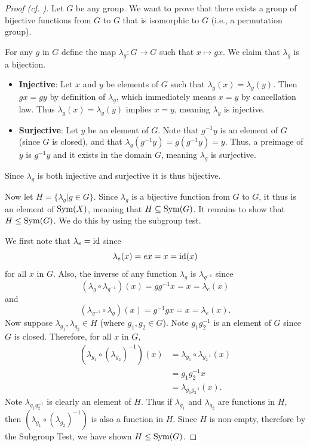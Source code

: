 \begin{proof}[Proof (cf. {\cite[Proof 2]{proofwiki_cayleytheorem}})]
    Let $G$ be any group. We want to prove that there exists a group of bijective functions from $G$ to $G$ that is isomorphic to $G$ (i.e., a permutation group).

    For any $g$ in $G$ define the map $\lambda_g: G \to G$ such that $x \mapsto gx$. We claim that $\lambda_g$ is a bijection.
    \begin{itemize}
        \item \textbf{Injective}: Let $x$ and $y$ be elements of $G$ such that $\lambda_g(x) = \lambda_g(y)$. Then $gx = gy$ by definition of $\lambda_g$, which immediately means $x = y$ by cancellation law. Thus $\lambda_g(x) = \lambda_g(y)$ implies $x = y$, meaning $\lambda_g$ is injective.
        
        \item \textbf{Surjective}: Let $y$ be an element of $G$. Note that $g^{-1}y$ is an element of $G$ (since $G$ is closed), and that $\lambda_g(g^{-1}y) = g(g^{-1}y) = y$. Thus, a preimage of $y$ is $g^{-1}y$ and it exists in the domain $G$, meaning $\lambda_g$ is surjective.
    \end{itemize}
    Since $\lambda_g$ is both injective and surjective it is thus bijective.

    Now let $H = \{\lambda_g \vert g \in G\}$. Since $\lambda_g$ is a bijective function from $G$ to $G$, it thus is an element of $\mathrm{Sym}(X)$, meaning that $H \subseteq \mathrm{Sym}(G)$. It remains to show that $H \leq \mathrm{Sym}(G)$. We do this by using the subgroup test.

    We first note that $\lambda_e = \mathrm{id}$ since
    \[
        \lambda_e(x) = ex = x = \mathrm{id}(x)
    \]
    for all $x$ in $G$. Also, the inverse of any function $\lambda_g$ is $\lambda_{g^{-1}}$ since
    \[
        (\lambda_g \circ \lambda_{g^{-1}})(x) = gg^{-1}x = x = \lambda_e(x)
    \]
    and
    \[
        (\lambda_{g^{-1}} \circ \lambda_g)(x) = g^{-1}gx = x = \lambda_e(x).
    \]
    Now suppose $\lambda_{g_1}, \lambda_{g_2} \in H$ (where $g_1, g_2 \in G$). Note $g_1g_2^{-1}$ is an element of $G$ since $G$ is closed. Therefore, for all $x$ in $G$,
    \begin{align*}
        \left(\lambda_{g_1} \circ \left(\lambda_{g_2}\right)^{-1}\right)(x) &= \lambda_{g_1}\circ\lambda_{g_2^{-1}}(x)\\
        &= g_1g_2^{-1}x\\
        &= \lambda_{g_1g_2^{-1}}(x).
    \end{align*}
    Note $\lambda_{g_1g_2^{-1}}$ is clearly an element of $H$. Thus if $\lambda_{g_1}$ and $\lambda_{g_2}$ are functions in $H$, then $\left(\lambda_{g_1} \circ \left(\lambda_{g_2}\right)^{-1}\right)$ is also a function in $H$. Since $H$ is non-empty, therefore by the Subgroup Test, we have shown $H \leq \mathrm{Sym}(G)$.


\end{proof}
